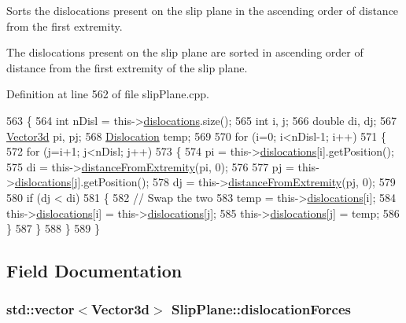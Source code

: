 Sorts the dislocations present on the slip plane in the ascending order of distance from the first extremity. 

The dislocations present on the slip plane are sorted in ascending order of distance from the first extremity of the slip plane. 

Definition at line 562 of file slip\-Plane.\-cpp.


\begin{DoxyCode}
563 \{
564   \textcolor{keywordtype}{int} nDisl = this->\hyperlink{classSlipPlane_ad92c7c409f7e161db449528389180910}{dislocations}.size();
565   \textcolor{keywordtype}{int} i, j;
566   \textcolor{keywordtype}{double} di, dj;
567   \hyperlink{classVector3d}{Vector3d} pi, pj;
568   \hyperlink{classDislocation}{Dislocation} temp;
569 
570   \textcolor{keywordflow}{for} (i=0; i<nDisl-1; i++)
571     \{
572       \textcolor{keywordflow}{for} (j=i+1; j<nDisl; j++)
573         \{
574           pi = this->\hyperlink{classSlipPlane_ad92c7c409f7e161db449528389180910}{dislocations}[i].getPosition();
575           di = this->\hyperlink{classSlipPlane_a3523030cccb520b5253a811d062f3ddf}{distanceFromExtremity}(pi, 0);
576           
577           pj = this->\hyperlink{classSlipPlane_ad92c7c409f7e161db449528389180910}{dislocations}[j].getPosition();
578           dj = this->\hyperlink{classSlipPlane_a3523030cccb520b5253a811d062f3ddf}{distanceFromExtremity}(pj, 0);
579           
580           \textcolor{keywordflow}{if} (dj < di)
581             \{
582               \textcolor{comment}{// Swap the two}
583               temp = this->\hyperlink{classSlipPlane_ad92c7c409f7e161db449528389180910}{dislocations}[i];
584               this->\hyperlink{classSlipPlane_ad92c7c409f7e161db449528389180910}{dislocations}[i] = this->\hyperlink{classSlipPlane_ad92c7c409f7e161db449528389180910}{dislocations}[j];
585               this->\hyperlink{classSlipPlane_ad92c7c409f7e161db449528389180910}{dislocations}[j] = temp;
586             \}
587         \}
588     \}
589 \}
\end{DoxyCode}


\subsection{Field Documentation}
\hypertarget{classSlipPlane_a2a74ae1f66a59e53a3ca0c9b81b28f7d}{
\subsubsection[{dislocation\-Forces}]{\setlength{\rightskip}{0pt plus 5cm}std\-::vector$<${\bf Vector3d}$>$ Slip\-Plane\-::dislocation\-Forces\hspace{0.3cm}{\ttfamily [protected]}}}\label{db/d25/classSlipPlane_a2a74ae1f66a59e53a3ca0c9b81b28f7d}


